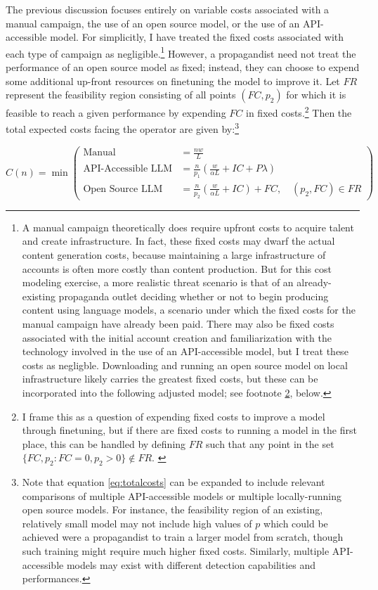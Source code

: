 \documentclass{article}
\begin{document}
The previous discussion focuses entirely on variable costs associated with a manual campaign, the use of an open source model, or the use of an API-accessible model. For simplicitly, I have treated the fixed costs associated with each type of campaign as negligible.\footnote{A manual campaign theoretically does require upfront costs to acquire talent and create infrastructure. In fact, these fixed costs may dwarf the actual content generation costs, because maintaining a large infrastructure of accounts is often more costly than content production. But for this cost modeling exercise, a more realistic threat scenario is that of an already-existing propaganda outlet deciding whether or not to begin producing content using language models, a scenario under which the fixed costs for the manual campaign have already been paid. There may also be fixed costs associated with the initial account creation and familiarization with the technology involved in the use of an API-accessible model, but I treat these costs as negligble. Downloading and running an open source model on local infrastructure likely carries the greatest fixed costs, but these can be incorporated into the following adjusted model; see footnote \ref{feasibilityset}, below.} However, a propagandist need not treat the performance of an open source model as fixed; instead, they can choose to expend some additional up-front resources on finetuning the model to improve it. Let $FR$ represent the feasibility region consisting of all points $(FC, p_2)$ for which it is feasible to reach a given performance by expending $FC$ in fixed costs.\footnote{I frame this as a question of expending fixed costs to improve a model through finetuning, but if there are fixed costs to running a model in the first place, this can be handled by defining $FR$ such that any point in the set $\{ FC, p_2 : FC = 0, p_2 > 0 \} \notin FR$. \label{feasibilityset}} Then the total expected costs facing the operator are given by:\footnote{Note that equation \ref{eq:totalcosts} can be expanded to include relevant comparisons of multiple API-accessible models or multiple locally-running open source models. For instance, the feasibility region of an existing, relatively small model may not include high values of $p$ which could be achieved were a propagandist to train a larger model from scratch, though such training might require much higher fixed costs. Similarly, multiple API-accessible models may exist with different detection capabilities and performances.}

\begin{equation}
  \label{eq:totalcosts}
  C(n) = \min \left(
  \begin{aligned}
    \text{Manual} &= \frac{nw}{L} \\
    \text{API-Accessible LLM} &= \frac{n}{p_{1}} \left( \frac{w}{\alpha L} + IC + P \lambda \right) \\
    \text{Open Source LLM} &= \frac{n}{p_{2}} \left( \frac{w}{\alpha L} + IC \right) + FC, \quad (p_2, FC) \in FR
  \end{aligned}
  \right)
\end{equation}
\end{document}
